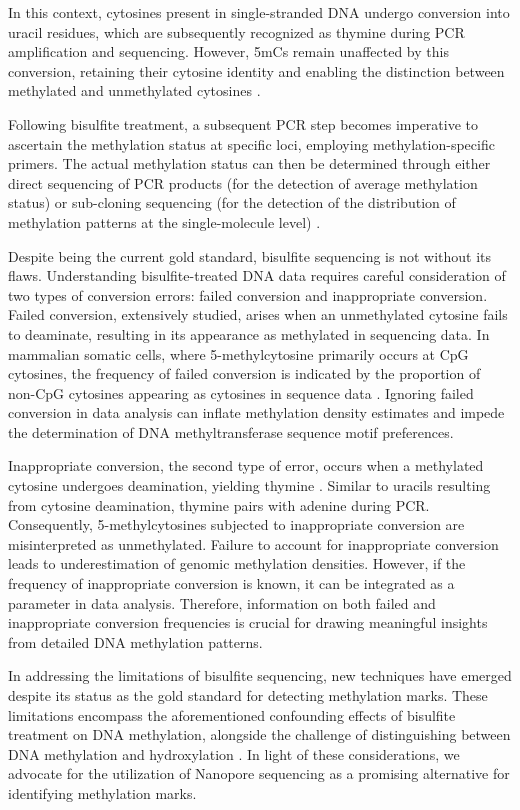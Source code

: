 In this context, cytosines present in single-stranded DNA undergo conversion into uracil residues, which are subsequently recognized as thymine during PCR amplification and sequencing. However, \acsp{5mC} remain unaffected by this conversion, retaining their cytosine identity and enabling the distinction between methylated and unmethylated cytosines \citep{bisulfite2}. 

Following bisulfite treatment, a subsequent PCR step becomes imperative to ascertain the methylation status at specific loci, employing methylation-specific primers. The actual methylation status can then be determined through either direct sequencing of PCR products (for the detection of average methylation status) or sub-cloning sequencing (for the detection of the distribution of methylation patterns at the single-molecule level) \citep{bisulfite2}.

Despite being the current gold standard, bisulfite sequencing is not without its flaws. Understanding bisulfite-treated DNA data requires careful consideration of two types of conversion errors: failed conversion and inappropriate conversion. Failed conversion, extensively studied, arises when an unmethylated cytosine fails to deaminate, resulting in its appearance as methylated in sequencing data. In mammalian somatic cells, where 5-methylcytosine primarily occurs at CpG cytosines, the frequency of failed conversion is indicated by the proportion of non-CpG cytosines appearing as cytosines in sequence data \citep{bisulfite_failed_conv}. Ignoring failed conversion in data analysis can inflate methylation density estimates and impede the determination of DNA methyltransferase sequence motif preferences.

Inappropriate conversion, the second type of error, occurs when a methylated cytosine undergoes deamination, yielding thymine \citep{bisulfite_inappr_conv}. Similar to uracils resulting from cytosine deamination, thymine pairs with adenine during PCR. Consequently, 5-methylcytosines subjected to inappropriate conversion are misinterpreted as unmethylated. Failure to account for inappropriate conversion leads to underestimation of genomic methylation densities. However, if the frequency of inappropriate conversion is known, it can be integrated as a parameter in data analysis. Therefore, information on both failed and inappropriate conversion frequencies is crucial for drawing meaningful insights from detailed DNA methylation patterns.

In addressing the limitations of bisulfite sequencing, new techniques have emerged despite its status as the gold standard for detecting methylation marks. These limitations encompass the aforementioned confounding effects of bisulfite treatment on DNA methylation, alongside the challenge of distinguishing between DNA methylation and hydroxylation \citep{ont_vs_bisulfite}. In light of these considerations, we advocate for the utilization of Nanopore sequencing as a promising alternative for identifying methylation marks.

